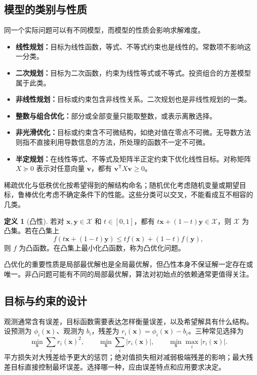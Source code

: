 \documentclass[UTF8,fontset=fandol,a4paper,12pt]{ctexart}
\newcommand{\vx}{\boldsymbol x}
\theoremstyle{definition}
\newtheorem{definition}{定义}[section]
\begin{document}
\subsection{模型的类别与性质}
同一个实际问题可以有不同模型，而模型的性质会影响求解难度。
\begin{itemize}
\item \textbf{线性规划：}目标为线性函数，等式、不等式约束也是线性的。常数项不影响这一分类。
\item \textbf{二次规划：}目标为二次函数，约束为线性等式或不等式。投资组合的方差模型属于此类。
\item \textbf{非线性规划：}目标或约束包含非线性关系。二次规划也是非线性规划的一类。
\item \textbf{整数与组合优化：}部分或全部变量只能取整数，或表示离散选择。
\item \textbf{非光滑优化：}目标或约束含不可微结构，如绝对值在零点不可微。无导数方法则指不直接利用导数信息的方法，所处理的函数不一定不可微。
\item \textbf{半定规划：}在线性等式、不等式及矩阵半正定约束下优化线性目标。对称矩阵 $X\succeq0$ 表示对任意向量 $\boldsymbol v$，都有 $\boldsymbol v^{\mathsf T}X\boldsymbol v\ge0$。
\end{itemize}
稀疏优化与低秩优化按希望得到的解结构命名；随机优化考虑随机变量或期望目标，鲁棒优化考虑不确定条件下的性能。这些分类可以交叉，不能看成互不相容的几类。

\begin{definition}[凸性]
若对 $\vx,\boldsymbol y\in\mathcal X$ 和 $t\in[0,1]$，都有 $t\vx+(1-t)\boldsymbol y\in\mathcal X$，则 $\mathcal X$ 为凸集。若在凸集上
\[
 f(t\vx+(1-t)\boldsymbol y)\le t f(\vx)+(1-t)f(\boldsymbol y),
\]
则 $f$ 为凸函数。在凸集上最小化凸函数，称为凸优化问题。
\end{definition}
凸优化的重要性质是局部最优解也是全局最优解，但凸性本身不保证解一定存在或唯一。非凸问题可能有不同的局部最优解，算法对初始点的依赖通常更值得关注。

\subsection{目标与约束的设计}
观测通常含有误差，目标函数需要表达怎样衡量误差，以及希望解具有什么结构。设预测为 $\phi_i(\vx)$、观测为 $b_i$，残差为 $r_i(\vx)=\phi_i(\vx)-b_i$。三种常见选择为
\[
 \min_{\vx}\sum_i r_i(\vx)^2,\qquad
 \min_{\vx}\sum_i|r_i(\vx)|,\qquad
 \min_{\vx}\max_i|r_i(\vx)|.
\]
平方损失对大残差给予更大的惩罚；绝对值损失相对减弱极端残差的影响；最大残差目标直接控制最坏误差。选择哪一种，应由误差特点和应用要求决定。
\end{document}
